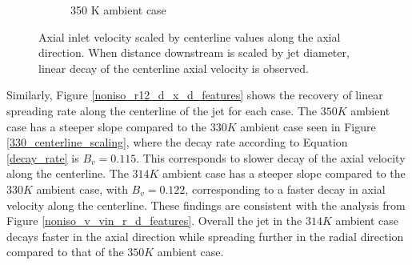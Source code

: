 \begin{figure}[htbp!]
\begin{center}
\begin{subfigure}{0.45\textwidth}
	\caption{350 K ambient case} \label{noniso_uin_u0_x_d_2}
\end{subfigure}
\caption{Axial inlet velocity scaled by centerline values along the axial direction. When distance downstream is scaled by jet diameter, linear decay of the centerline axial velocity is observed.}
\label{noniso_uin_u0_x_d_features}
\end{center}
\end{figure}

Similarly, Figure \ref{noniso_r12_d_x_d_features} shows the recovery of linear spreading rate along the centerline of the jet for each case. The $350 K$ ambient case has a steeper slope compared to the $330 K$ ambient case seen in Figure \ref{330_centerline_scaling}, where the decay rate according to Equation \ref{decay_rate} is $B_v = 0.115$. This corresponds to slower decay of the axial velocity along the centerline. The $314 K$ ambient case has a steeper slope compared to the $330 K$ ambient case, with $B_v = 0.122$, corresponding to a faster decay in axial velocity along the centerline. These findings are consistent with the analysis from Figure \ref{noniso_v_vin_r_d_features}. Overall the jet in the $314 K$ ambient case decays faster in the axial direction while spreading further in the radial direction compared to that of the $350 K$ ambient case. 
